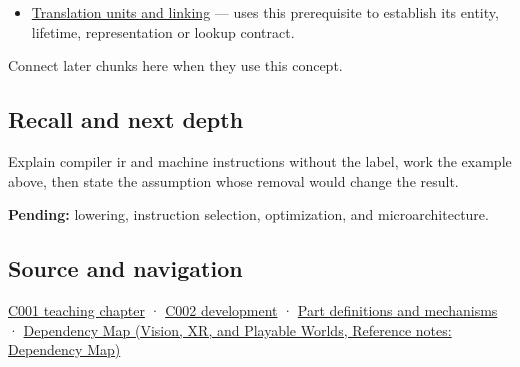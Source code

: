 \begin{itemize}
\tightlist
\item
  \hyperref[appendix-806686359e1b]{Translation units and linking} --- uses this prerequisite to establish its entity, lifetime, representation or lookup contract.
\end{itemize}

Connect later chunks here when they use this concept.

\subsection{Recall and next depth}\label{appendix-942ad41afb30-recall-and-next-depth}

Explain compiler ir and machine instructions without the label, work the example above, then state the assumption whose removal would change the result.

\textbf{Pending:} lowering, instruction selection, optimization, and microarchitecture.

\subsection{Source and navigation}\label{appendix-942ad41afb30-source-and-navigation}

\hyperref[01-foundations-i-ch001-from-a-signal-to-an-interpretation]{C001 teaching chapter} · \hyperref[01-foundations-i-ch001-arithmetic-becomes-a-policy]{C002 development} · \hyperref[appendix-fd090d982a15]{Part definitions and mechanisms} · \href{../07-Vision-XR-and-Playable-Worlds/main.pdf\#nameddest=appendix-4ad47bdd269a}{Dependency Map (Vision, XR, and Playable Worlds, Reference notes: Dependency Map)}
